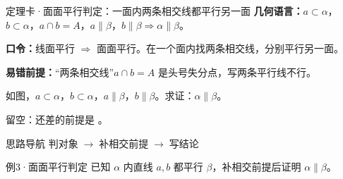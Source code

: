 \documentclass{exam-zh}
\begin{document}
\begin{eduSolutionBox}{定理卡·面面平行判定：一面内两条相交线都平行另一面}
  \begingroup
  \setlength{\parskip}{2.5mm}
\textbf{几何语言：}$a\subset\alpha$，$b\subset\alpha$，$a\cap b=A$，$a\parallel\beta$，$b\parallel\beta\Rightarrow\alpha\parallel\beta$。\par
\textbf{口令：}线面平行 $\Rightarrow$ 面面平行。在一个面内找两条相交线，分别平行另一面。\par
\textbf{易错前提：}“两条相交线”$a\cap b=A$ 是头号失分点，写两条平行线不行。\par
  \endgroup
\end{eduSolutionBox}




\begin{eduProblemBlock}[例3·面面平行判定]
如图，$a\subset\alpha$，$b\subset\alpha$，$a\parallel\beta$，$b\parallel\beta$。求证：$\alpha\parallel\beta$。
\par\noindent 留空：还差的前提是 \underline{\hspace{20mm}}。

\end{eduProblemBlock}





\begin{eduAuxItem}{思路导航}
判对象$\;\to\;$补相交前提$\;\to\;$写结论\end{eduAuxItem}




\begin{eduSubQuestionItem}{例3·面面平行判定}
已知 $\alpha$ 内直线 $a,b$ 都平行 $\beta$，补相交前提后证明 $\alpha\parallel\beta$。\end{eduSubQuestionItem}

\begin{eduDualExplain}
  \begin{eduExplainLeft}
  \end{eduExplainLeft}

  \begin{eduExplainRight}
  \end{eduExplainRight}
\end{eduDualExplain}
\end{document}
